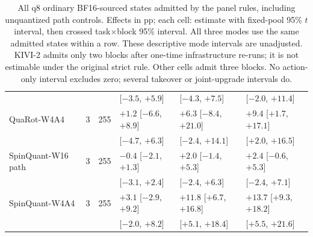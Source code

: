\begin{table}[t]
\begin{tabular}{@{}lrrlll@{}}
 & & & [$-3.5$, $+5.9$] & [$-4.3$, $+7.5$] & [$-2.0$, $+11.4$] \\
QuaRot-W4A4 & 3 & 255 & $+1.2$ [$-6.6$, $+8.9$] & $+6.3$ [$-8.4$, $+21.0$] & $+9.4$ [$+1.7$, $+17.1$] \\
 & & & [$-4.7$, $+6.3$] & [$-2.4$, $+14.1$] & [$+2.0$, $+16.5$] \\
SpinQuant-W16 path & 3 & 255 & $-0.4$ [$-2.1$, $+1.3$] & $+2.0$ [$-1.4$, $+5.3$] & $+2.4$ [$-0.6$, $+5.3$] \\
 & & & [$-3.1$, $+2.4$] & [$-2.4$, $+6.3$] & [$-2.4$, $+7.1$] \\
SpinQuant-W4A4 & 3 & 255 & $+3.1$ [$-2.9$, $+9.2$] & $+11.8$ [$+6.7$, $+16.8$] & $+13.7$ [$+9.3$, $+18.2$] \\
 & & & [$-2.0$, $+8.2$] & [$+5.1$, $+18.4$] & [$+5.5$, $+21.6$] \\

\bottomrule
\end{tabular}
\caption{All q8 ordinary BF16-sourced states admitted by the panel rules, including unquantized path controls. Effects in pp; each cell: estimate with fixed-pool 95\% $t$ interval, then crossed task$\times$block 95\% interval. All three modes use the same admitted states within a row. These descriptive mode intervals are unadjusted. KIVI-2 admits only two blocks after one-time infrastructure re-runs; it is not estimable under the original strict rule. Other cells admit three blocks. No action-only interval excludes zero; several takeover or joint-upgrade intervals do.}
\label{tab:ordinary-modes}
\end{table}


